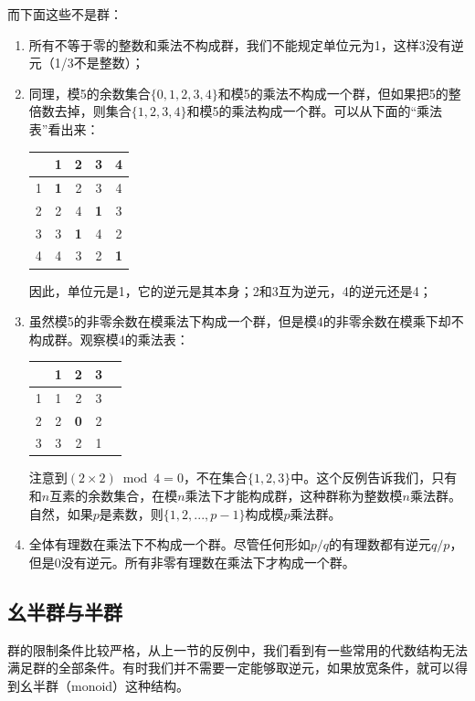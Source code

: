 \documentclass{article}
\begin{document}
而下面这些不是群：

\begin{enumerate}
\item 所有不等于零的整数和乘法不构成群，我们不能规定单位元为1，这样3没有逆元（1/3不是整数）；
\item 同理，模5的余数集合$\{0, 1, 2, 3, 4\}$和模5的乘法不构成一个群，但如果把5的整倍数去掉，则集合$\{1, 2, 3, 4\}$和模5的乘法构成一个群。可以从下面的“乘法表”看出来：

  \begin{tabular}{c|cccc}
    & 1 & 2 & 3 & 4 \\
  \hline
  1 & \textbf{1} & 2 & 3 & 4 \\
  2 & 2 & 4 & \textbf{1} & 3 \\
  3 & 3 & \textbf{1} & 4 & 2 \\
  4 & 4 & 3 & 2 & \textbf{1}
  \end{tabular}

因此，单位元是1，它的逆元是其本身；2和3互为逆元，4的逆元还是4；
\item 虽然模5的非零余数在模乘法下构成一个群，但是模4的非零余数在模乘下却不构成群。观察模4的乘法表：

  \begin{tabular}{c|cccc}
    & 1 & 2 & 3 \\
  \hline
  1 & 1 & 2 & 3 \\
  2 & 2 & \textbf{0} & 2 \\
  3 & 3 & 2 & 1 \\
  \end{tabular}

注意到$(2 \times 2) \bmod 4 = 0$，不在集合$\{1, 2, 3\}$中。这个反例告诉我们，只有和$n$互素的余数集合，在模$n$乘法下才能构成群，这种群称为整数模$n$乘法群。自然，如果$p$是素数，则$\{1, 2, ..., p-1\}$构成模$p$乘法群。
\item 全体有理数在乘法下不构成一个群。尽管任何形如$p/q$的有理数都有逆元$q/p$，但是0没有逆元。所有非零有理数在乘法下才构成一个群。
\end{enumerate}

\begin{Exercise}
\end{Exercise}

\subsection{幺半群与半群}
群的限制条件比较严格，从上一节的反例中，我们看到有一些常用的代数结构无法满足群的全部条件。有时我们并不需要一定能够取逆元，如果放宽条件，就可以得到幺半群（monoid）这种结构。
\end{document}
